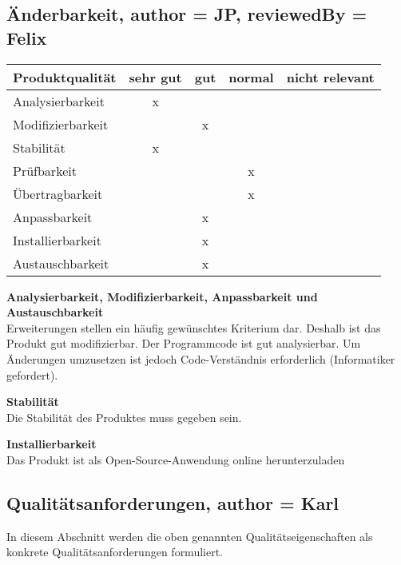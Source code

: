 \documentclass[parskip=full]{scrartcl} %
\begin{document}
\subsection{Änderbarkeit, author = JP, reviewedBy = Felix}
    \begin{tabular}{|l| c| c| c| c|}
    \hline
        Produktqualität & sehr gut & gut & normal & nicht relevant \\
    \hline
        Analysierbarkeit & x & & &\\
    \hline
        Modifizierbarkeit & & x & &\\
    \hline
        Stabilität & x & & &\\
    \hline
        Prüfbarkeit & & & x &\\
    \hline
        Übertragbarkeit & & & x &\\
    \hline
        Anpassbarkeit & & x & &\\
    \hline
        Installierbarkeit & & x & &\\
    \hline
        Austauschbarkeit & & x & &\\
    \hline
    \end{tabular}
    
\textbf{Analysierbarkeit, Modifizierbarkeit, Anpassbarkeit und Austauschbarkeit}\\
Erweiterungen stellen ein häufig gewünschtes Kriterium dar. Deshalb ist das Produkt gut modifizierbar. Der Programmcode ist gut analysierbar. Um Änderungen umzusetzen ist jedoch Code-Verständnis erforderlich (Informatiker gefordert).

\textbf{Stabilität}\\
Die Stabilität des Produktes muss gegeben sein.

\textbf{Installierbarkeit}\\
Das Produkt ist als Open-Source-Anwendung online herunterzuladen


\newpage 


\subsection{Qualitätsanforderungen, author = Karl}
In diesem Abschnitt werden die oben genannten Qualitätseigenschaften als konkrete Qualitätsanforderungen formuliert.
\end{document}
